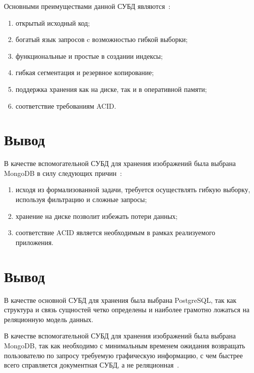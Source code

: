 Основными преимуществами данной СУБД являются~\cite{cmpNosql1}:
\begin{enumerate}
	\item открытый исходный код;
	\item богатый язык запросов c возможностью гибкой выборки;
	\item функциональные и простые в создании индексы;
	\item гибкая сегментация и резервное копирование;
	\item поддержка хранения как на диске, так и в оперативной памяти;
	\item соответствие требованиям ACID.
\end{enumerate}

\section*{Вывод}

В качестве вспомогательной СУБД для хранения изображений была выбрана MongoDB в силу следующих причин~\cite{cmpNosql1}:
\begin{enumerate}
	\item исходя из формализованной задачи, требуется осуществлять гибкую выборку, используя фильтрацию и сложные запросы;
	\item хранение на диске позволит избежать потери данных;
	\item соответствие ACID является необходимым в рамках реализуемого приложения.
\end{enumerate}

\section{Вывод}

В качестве основной СУБД для хранения была выбрана PostgreSQL, так как структура и связь сущностей четко определены и наиболее грамотно ложаться на реляционную модель данных.

В качестве вспомогательной СУБД для хранения изображений была выбрана MongoDB, так как необходимо с минимальным временем ожидания возвращать пользователю по запросу требуемую графическую информацию, с чем быстрее всего справляется документная СУБД, а не реляционная~\cite{cmpNosqlSCDB}.